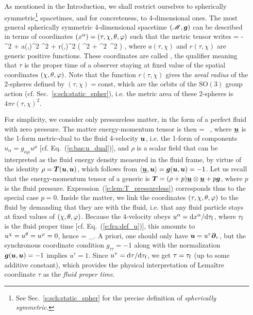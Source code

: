 As mentioned in the Introduction, we shall restrict ourselves to
spherically symmetric\footnote{See Sec.~\ref{s:sch:static_spher} for the precise
definition of \emph{spherically symmetric}.} spacetimes, and for concreteness, to 4-dimensional ones. The most general spherically symmetric 4-dimensional spacetime $(\mathscr{M},\bm{g})$
can be described in terms of coordinates $(x^\alpha)=(\tau,\chi,\theta,\varphi)$ such that
the metric tensor writes
\be \label{e:lem:metric_sync_coord}
     = - \dd\tau^2 + a(\tau,\chi)^2 \dd\chi^2
        + r(\tau,\chi)^2 \left( \dd\th^2 + \sin^2\th\, \dd\ph^2 \right)  ,
\ee
where $a(\tau,\chi)$ and $r(\tau,\chi)$ are generic positive functions.
These coordinates are called , the qualifier
 meaning that $\tau$ is the proper time of a observer staying
at fixed value of the spatial coordinates $(\chi,\theta,\varphi)$.
Note that the function $r(\tau,\chi)$ gives the \emph{areal radius}
of the 2-spheres
defined by $(\tau,\chi) = \mathrm{const}$, which are the orbits of the $\mathrm{SO}(3)$
group action (cf. Sec.~\ref{s:sch:static_spher}), i.e. the metric area of these
2-spheres is $4\pi r(\tau,\chi)^2$.

For simplicity, we consider only pressureless matter, in the form of a perfect
fluid with zero pressure. The matter energy-momentum tensor is then
\be \label{e:lem:T_pressureless}
     = \rho \,  \otimes {} ,
\ee
where $\underline{\bm{u}}$ is the 1-form metric-dual to the fluid 4-velocity $\bm{u}$,
i.e. the 1-form of components $u_\alpha = g_{\alpha\mu} u^\mu$ [cf. Eq.~(\ref{e:bas:u_dual})],
and $\rho$ is a scalar field that can be interpreted as the fluid energy density
measured in the fluid frame, by virtue of the identity
$\rho = \bm{T}(\bm{u}, \bm{u})$, which follows from $\langle \underline{\bm{u}}, \bm{u} \rangle = \bm{g}(\bm{u},\bm{u}) = -1$.
Let us recall that the energy-momentum tensor of a generic
 is
$\bm{T} = (\rho + p)\underline{\bm{u}} \otimes \underline{\bm{u}} + p \bm{g}$, where $p$
is the fluid pressure. Expression~(\ref{e:lem:T_pressureless}) corresponds thus
to the special case $p=0$.
Inside the matter, we link the coordinates $(\tau,\chi,\theta,\varphi)$ to the fluid by demanding
that they are  with the fluid, i.e. that any fluid particle
stays at fixed values of $(\chi,\theta,\varphi)$.
Because the 4-velocity obeys $u^\alpha = \mathrm{d} x^\alpha/\mathrm{d} \tau_{\rm f}$, where
$\tau_{\rm f}$ is the fluid proper time [cf. Eq.~(\ref{e:fra:def_u})], this
amounts to $u^\chi=u^\theta = u^\varphi = 0$, hence
\be \label{e:lem:u_par_tau}
     = \wpar_\tau .
\ee
A priori, one should only have $\bm{u} =  u^\tau\bm{\partial}_\tau$, but the
synchronous coordinate condition $g_{\tau\tau} = -1$ along with the
normalization $\bm{g}(\bm{u},\bm{u})=-1$ implies $u^\tau=1$. Since $u^\tau = \mathrm{d}\tau / \mathrm{d}\tau_{\rm f}$, we get $\tau = \tau_{\rm f}$ (up to some additive constant), which provides the physical
interpretation of Lemaître coordinate $\tau$ as the \emph{fluid proper time}.

